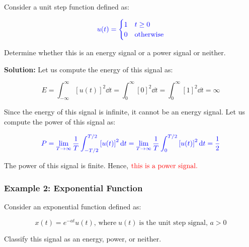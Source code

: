 \documentclass[
  12pt,
  a4paper,
]{report}
\newcommand{\bluetext}[1]{\textcolor{blue}{#1}}
\begin{document}
Consider a unit step function defined as:

\begin{equation}
    \label{eq:unit-step-function-example}     
    \bluetext{u(t) =         
        \begin{cases}             
        1 & t \geq 0         \\             
        0 & \text{otherwise}         
        \end{cases}} 
\end{equation}

Determine whether this is an energy signal or a power signal or neither.

\textbf{Solution:} Let us compute the energy of this signal as:

\begin{equation}     
    \label{eq:unit-step-energy}     
    E = \int_{-\infty}^{\infty} {[u(t)]}^2 \dd{t} = \int_{0}^{\infty} {[0]}^2 \dd{t} = \int_{0}^{\infty} {[1]}^2 \dd{t} = \infty 
\end{equation}

Since the energy of this signal is infinite, it cannot be an energy
signal. Let us compute the power of this signal as:

\begin{equation}     
    \label{eq:unit-step-power}     
    \bluetext{P = \lim_{T \to \infty} \frac{1}{T} \int_{-T/2}^{T/2} {[u(t)]}^2 \dd{t} = \lim_{T \to \infty} \frac{1}{T} \int_{0}^{T/2} {[u(t)]}^2 \dd{t} = \frac{1}{2}} 
\end{equation}

The power of this signal is finite. Hence,
\(\textcolor{red}{\text{this is a power signal.}}\)

\subsubsection{Example 2: Exponential
Function}\label{example-2-exponential-function}

Consider an exponential function defined as:

\begin{equation}     
\label{eq:exponential-function-example}
    x(t) = e^{-at}u(t), \, \text{where} \; u(t) \;\text{is the unit step signal},\, a > 0 
\end{equation}

Classify this signal as an energy, power, or neither.
\end{document}
